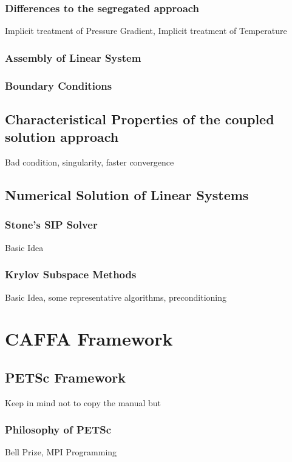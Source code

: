 \documentclass[article,type=msc,colorback,accentcolor=tud2a]{tudthesis}
\begin{document}
      \subsubsection{Differences to the segregated approach}

        Implicit treatment of Pressure Gradient, Implicit treatment of Temperature

      \subsubsection{Assembly of Linear System}

      \subsubsection{Boundary Conditions}

      \subsection{Characteristical Properties of the coupled solution approach}

      Bad condition, singularity, faster convergence

      \subsection{Numerical Solution of Linear Systems}

        \subsubsection{Stone's SIP Solver}
        Basic Idea
        \subsubsection{Krylov Subspace Methods}
        Basic Idea, some representative algorithms, preconditioning

  \section{CAFFA Framework}

    \subsection{PETSc Framework}
      Keep in mind not to copy the manual but
      \subsubsection{Philosophy of PETSc}
        Bell Prize, MPI Programming
\end{document}
